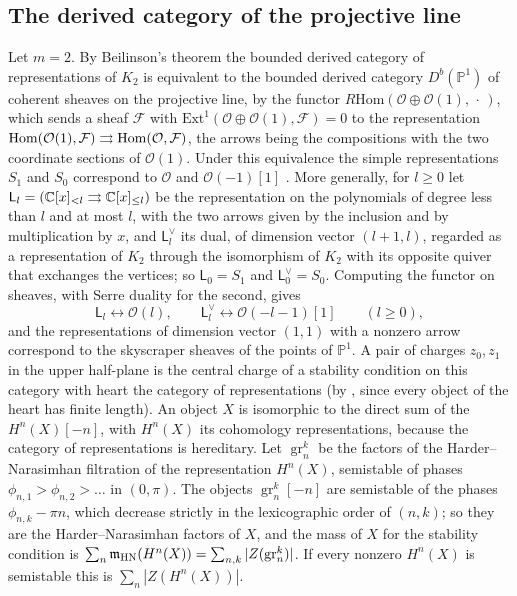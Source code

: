 \subsection{The derived category of the projective line}
Let $m=2$. By Beilinson's theorem \cite{bei78} the bounded derived category
of representations of $K_2$ is equivalent to the bounded derived category
$D^b(\mathbb P^1)$ of coherent sheaves on the projective line, by the functor
$R\mathrm{Hom}(\mathcal O\oplus\mathcal O(1),\,\cdot\,)$, which sends a sheaf
$\mathcal F$ with $\mathrm{Ext}^1(\mathcal O\oplus\mathcal O(1),\mathcal F)=0$
to the representation
$\operatorname{Hom}(\mathcal O(1),\mathcal F)\rightrightarrows\operatorname{Hom}(\mathcal O,\mathcal F)$,
the arrows being the compositions with the two coordinate sections of
$\mathcal O(1)$. Under this equivalence the simple representations $S_1$ and
$S_0$ correspond to $\mathcal O$ and $\mathcal O(-1)[1]$
\cite[\S2.4]{oka06}. More generally, for $l\geq0$ let
$\mathsf L_l=(\mathbb C[x]_{<l}\rightrightarrows\mathbb C[x]_{\leq l})$ be the
representation on the polynomials of degree less than $l$ and at most $l$,
with the two arrows given by the inclusion and by multiplication by $x$, and
$\mathsf L_l^\vee$ its dual, of dimension vector $(l+1,l)$, regarded as a
representation of $K_2$ through the isomorphism of $K_2$ with its opposite
quiver that exchanges the vertices; so
$\mathsf L_0=S_1$ and $\mathsf L_0^\vee=S_0$. Computing the functor on
sheaves, with Serre duality for the second, gives
\[
 \mathsf L_l\leftrightarrow\mathcal O(l),\qquad
 \mathsf L_l^\vee\leftrightarrow\mathcal O(-l-1)[1]\qquad(l\geq0),
\]
and the representations of dimension vector $(1,1)$ with a nonzero arrow
correspond to the skyscraper sheaves of the points of $\mathbb P^1$. A pair of charges
$z_0,z_1$ in the upper half-plane is the central charge of a stability
condition on this category with heart the category of representations
(by \cite[Propositions~2.4 and~5.3]{bri07}, since every object of the heart
has finite length). An object $X$ is isomorphic to the direct sum
of the $H^n(X)[-n]$, with $H^n(X)$ its cohomology representations, because
the category of representations is hereditary. Let $\operatorname{gr}^k_n$
be the factors of the Harder--Narasimhan filtration of the representation
$H^n(X)$, semistable of phases $\phi_{n,1}>\phi_{n,2}>\dots$ in $(0,\pi)$.
The objects $\operatorname{gr}^k_n[-n]$ are semistable of the phases
$\phi_{n,k}-\pi n$, which decrease strictly in the lexicographic order of
$(n,k)$; so they are the Harder--Narasimhan factors of $X$, and the mass of
$X$ for the stability condition is
$\sum_n\mathfrak m_{\mathrm{HN}}(H^n(X))=\sum_{n,k}|Z(\operatorname{gr}^k_n)|$. If
every nonzero $H^n(X)$ is semistable this is $\sum_n|Z(H^n(X))|$.

